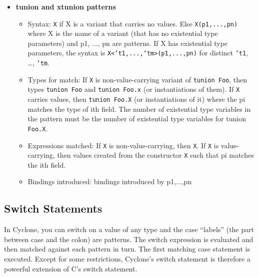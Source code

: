 \begin{itemize}
\item \textbf{tunion and xtunion patterns}
  \begin{itemize}
  \item Syntax: \texttt{X} if X is a variant that carries no values.
    Else \texttt{X(p1,...,pn)} where X is the name of a variant (that
    has no existential type parameters) and p1, ..., pn are patterns.
    If X has existential type parameters, the syntax is
    \texttt{X<`t1,...,`tm>(p1,...,pn)} for distinct \texttt{`t1}, \ldots,
    \texttt{`tm}.
  \item Types for match: If \texttt{X} is non-value-carrying variant of
    \texttt{tunion Foo}, then types \texttt{tunion Foo} and \texttt{tunion Foo.x}
    (or instantiations of them).  If \texttt{X} carries values, then
    \texttt{tunion Foo.X} (or instantiations of it) where the pi matches
    the type of ith field.  The number of existential type variables in the
    pattern must be the number of existential type variables for
    tunion \texttt{Foo.X}.
  \item Expressions matched: If \texttt{X} is non-value-carrying, then
    \texttt{X}.  If \texttt{X} is value-carrying, then values created from
    the constructor \texttt{X} such that pi matches the ith field.
  \item Bindings introduced: bindings introduced by p1,...,pn
  \end{itemize}
\end{itemize}

\subsection{Switch Statements}\hypertarget{switch_stmt}{}

In Cyclone, you can switch on a value of any type and the case
``labels'' (the part between case and the colon) are patterns.  The
switch expression is evaluated and then matched against each pattern
in turn.  The first matching case statement is executed.  Except for
some restrictions, Cyclone's switch statement is therefore a powerful
extension of C's switch statement.

